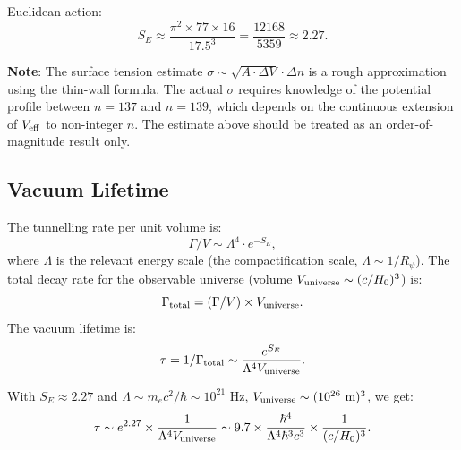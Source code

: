 \documentclass[12pt]{article}
\theoremstyle{definition}
\theoremstyle{remark}
\begin{document}
Euclidean action:
\begin{equation}
  S_E \approx \frac{\pi^2 \times 77 \times 16}{17.5^3}
  = \frac{12168}{5359} \approx 2.27.
  \label{eq:SE_value}
\end{equation}

\begin{gapbox}
\textbf{Note}: The surface tension estimate $\sigma \sim \sqrt{A\cdot\Delta V}\cdot\Delta n$
is a rough approximation using the thin-wall formula.  The actual $\sigma$ requires
knowledge of the potential profile between $n=137$ and $n=139$, which depends on the
continuous extension of $V_{\rm eff}$ to non-integer $n$.  The estimate above should
be treated as an order-of-magnitude result only.
\end{gapbox}

\subsection{Vacuum Lifetime}

The tunnelling rate per unit volume is:
\begin{equation}
  \Gamma/V \sim \Lambda^4 \cdot e^{-S_E},
\end{equation}
where $\Lambda$ is the relevant energy scale (the compactification scale,
$\Lambda \sim 1/R_\psi$).  The total decay rate for the observable universe
(volume $V_{\rm universe} \sim (c/H_0)^3$) is:
\begin{equation}
  \Gamma_{\rm total} = (\Gamma/V) \times V_{\rm universe}.
\end{equation}
The vacuum lifetime is:
\begin{equation}
  \tau = 1/\Gamma_{\rm total} \sim \frac{e^{S_E}}{\Lambda^4 V_{\rm universe}}.
  \label{eq:lifetime}
\end{equation}

With $S_E \approx 2.27$ and $\Lambda \sim m_e c^2 / \hbar \sim 10^{21}$ Hz,
$V_{\rm universe} \sim (10^{26} \text{ m})^3$, we get:
\begin{equation}
  \tau \sim e^{2.27} \times \frac{1}{\Lambda^4 V_{\rm universe}}
  \sim 9.7 \times \frac{\hbar^4}{\Lambda^4 \hbar^3 c^3} \times \frac{1}{(c/H_0)^3}.
\end{equation}
\end{document}
